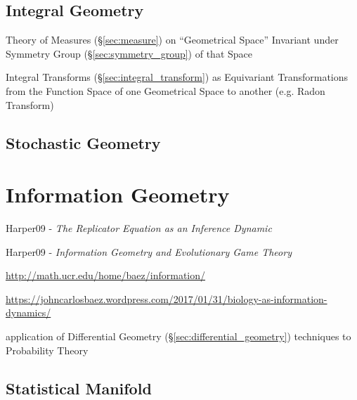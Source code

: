 \subsection{Integral Geometry}\label{sec:integral_geometry}

Theory of Measures (\S\ref{sec:measure}) on ``Geometrical Space'' Invariant
under Symmetry Group (\S\ref{sec:symmetry_group}) of that Space

Integral Transforms (\S\ref{sec:integral_transform}) as Equivariant
Transformations from the Function Space of one Geometrical Space to another
(e.g. Radon Transform)



\subsection{Stochastic Geometry}\label{sec:stochastic_geometry}



\section{Information Geometry}\label{sec:information_geometry}

Harper09 - \emph{The Replicator Equation as an Inference Dynamic}

Harper09 - \emph{Information Geometry and Evolutionary Game Theory}

\url{http://math.ucr.edu/home/baez/information/}

\url{https://johncarlosbaez.wordpress.com/2017/01/31/biology-as-information-dynamics/}

application of Differential Geometry
(\S\ref{sec:differential_geometry}) techniques to Probability Theory



\subsection{Statistical Manifold}\label{sec:statistical_manifold}

